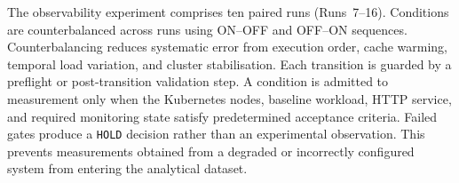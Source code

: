 \documentclass[pdflatex,sn-basic]{sn-jnl}
\theoremstyle{thmstyleone}%
\theoremstyle{thmstyletwo}%
\theoremstyle{thmstylethree}%
\begin{document}
The observability experiment comprises ten paired runs (Runs~7--16). Conditions are counterbalanced across runs using ON--OFF and OFF--ON sequences. Counterbalancing reduces systematic error from execution order, cache warming, temporal load variation, and cluster stabilisation. Each transition is guarded by a preflight or post-transition validation step. A condition is admitted to measurement only when the Kubernetes nodes, baseline workload, HTTP service, and required monitoring state satisfy predetermined acceptance criteria. Failed gates produce a \texttt{HOLD} decision rather than an experimental observation. This prevents measurements obtained from a degraded or incorrectly configured system from entering the analytical dataset.


\end{document}
